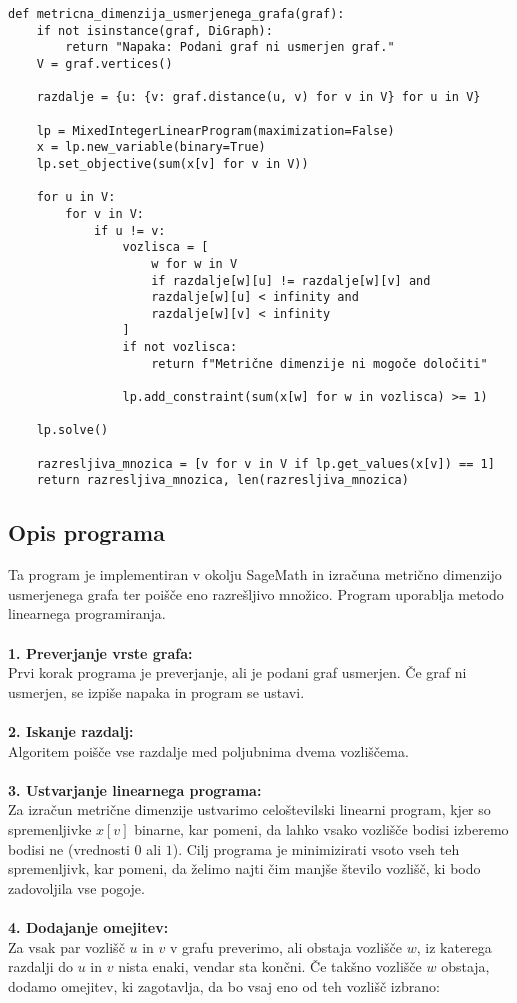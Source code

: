 \documentclass[a4paper,12pt]{article}
\theoremstyle{definition}
\theoremstyle{remark}
\theoremstyle{definition}
\begin{document}
\begin{lstlisting}
def metricna_dimenzija_usmerjenega_grafa(graf): 
    if not isinstance(graf, DiGraph):
        return "Napaka: Podani graf ni usmerjen graf."
    V = graf.vertices()

    razdalje = {u: {v: graf.distance(u, v) for v in V} for u in V}
    
    lp = MixedIntegerLinearProgram(maximization=False)
    x = lp.new_variable(binary=True) 
    lp.set_objective(sum(x[v] for v in V))
    
    for u in V:
        for v in V:
            if u != v:
                vozlisca = [
                    w for w in V
                    if razdalje[w][u] != razdalje[w][v] and
                    razdalje[w][u] < infinity and
                    razdalje[w][v] < infinity
                ]
                if not vozlisca:
                    return f"Metrične dimenzije ni mogoče določiti"
            
                lp.add_constraint(sum(x[w] for w in vozlisca) >= 1)
    
    lp.solve()
    
    razresljiva_mnozica = [v for v in V if lp.get_values(x[v]) == 1]
    return razresljiva_mnozica, len(razresljiva_mnozica)
    \end{lstlisting}


\newpage
\subsection*{Opis programa}

Ta program je implementiran v okolju SageMath in izračuna metrično dimenzijo usmerjenega grafa ter poišče eno razrešljivo množico. 
Program uporablja metodo linearnega programiranja.
\\
\\
\noindent
\textbf{1. Preverjanje vrste grafa:}\\
Prvi korak programa je preverjanje, ali je podani graf usmerjen. Če graf ni usmerjen, se izpiše napaka in program se ustavi.
\\
\\
\noindent
\textbf{2. Iskanje razdalj:} \\
Algoritem poišče vse razdalje med poljubnima dvema vozliščema.
\\
\\
\noindent
\textbf{3. Ustvarjanje linearnega programa:}\\
Za izračun metrične dimenzije ustvarimo celoštevilski linearni program, kjer so spremenljivke \( x[v] \) binarne, kar pomeni, da lahko vsako vozlišče bodisi izberemo bodisi ne (vrednosti \( 0 \) ali \( 1 \)). Cilj programa je minimizirati vsoto vseh teh spremenljivk, kar pomeni, da želimo najti čim manjše število vozlišč, ki bodo zadovoljila vse pogoje.
\\
\\
\noindent
\textbf{4. Dodajanje omejitev:}\\
Za vsak par vozlišč \( u \) in \( v \) v grafu preverimo, ali obstaja vozlišče \( w \), iz katerega razdalji do \( u \) in \( v \) nista enaki, vendar sta končni. Če takšno vozlišče \( w \) obstaja, dodamo omejitev, ki zagotavlja, da bo vsaj eno od teh vozlišč izbrano:
\end{document}
